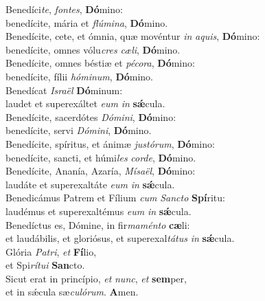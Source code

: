 \evenverse Benedíci\textit{te}, \textit{fon}\textit{tes}, \textbf{Dó}mino:~\*\\
\evenverse benedícite, mária et \textit{flú}\textit{mi}\textit{na}, \textbf{Dó}mino.\\
\oddverse Benedícite, cete, et ómnia, quæ movéntur \textit{in} \textit{a}\textit{quis}, \textbf{Dó}mino:~\*\\
\oddverse benedícite, omnes vólu\textit{cres} \textit{cæ}\textit{li}, \textbf{Dó}mino.\\
\evenverse Benedícite, omnes béstiæ et \textit{pé}\textit{co}\textit{ra}, \textbf{Dó}mino:~\*\\
\evenverse benedícite, fílii \textit{hó}\textit{mi}\textit{num}, \textbf{Dó}mino.\\
\oddverse Benedícat \textit{Is}\textit{ra}\textit{ël} \textbf{Dó}minum:~\*\\
\oddverse laudet et superexáltet \textit{e}\textit{um} \textit{in} \textbf{sǽ}cula.\\
\evenverse Benedícite, sacerdótes \textit{Dó}\textit{mi}\textit{ni}, \textbf{Dó}mino:~\*\\
\evenverse benedícite, servi \textit{Dó}\textit{mi}\textit{ni}, \textbf{Dó}mino.\\
\oddverse Benedícite, spíritus, et ánimæ \textit{ju}\textit{stó}\textit{rum}, \textbf{Dó}mino:~\*\\
\oddverse benedícite, sancti, et húmi\textit{les} \textit{cor}\textit{de}, \textbf{Dó}mino.\\
\evenverse Benedícite, Ananía, Azaría, \textit{Mí}\textit{sa}\textit{ël}, \textbf{Dó}mino:~\*\\
\evenverse laudáte et superexaltáte \textit{e}\textit{um} \textit{in} \textbf{sǽ}cula.\\
\oddverse Benedicámus Patrem et Fílium \textit{cum} \textit{San}\textit{cto} \textbf{Spí}ritu:~\*\\
\oddverse laudémus et superexaltémus \textit{e}\textit{um} \textit{in} \textbf{sǽ}cula.\\
\evenverse Benedíctus es, Dómine, in fir\textit{ma}\textit{mén}\textit{to} \textbf{cæ}li:~\*\\
\evenverse et laudábilis, et gloriósus, et superexal\textit{tá}\textit{tus} \textit{in} \textbf{sǽ}cula.\\
\oddverse Glória \textit{Pa}\textit{tri}, \textit{et} \textbf{Fí}lio,~\*\\
\oddverse et Spi\textit{rí}\textit{tu}\textit{i} \textbf{San}cto.\\
\evenverse Sicut erat in princípio, \textit{et} \textit{nunc}, \textit{et} \textbf{sem}per,~\*\\
\evenverse et in sǽcula sæ\textit{cu}\textit{ló}\textit{rum}. \textbf{A}men.\\
